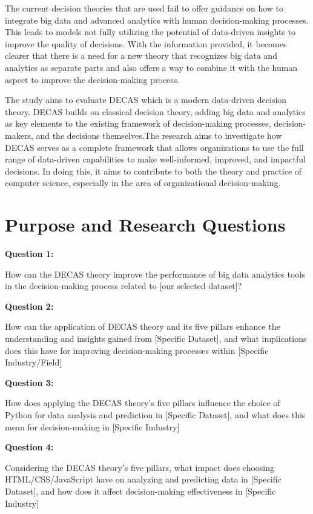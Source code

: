 The current decision theories that are used fail to offer guidance on how to integrate big data and advanced analytics with human decision-making processes. This leads to models not fully utilizing the potential of data-driven insights to improve the quality of decisions. With the information provided, it becomes clearer that there is a need for a new theory that recognizes big data and analytics as separate parts and also offers a way to combine it with the human aspect to improve the decision-making process.

The study aims to evaluate DECAS which is a modern data-driven decision theory. DECAS builds on classical decision theory, adding big data and analytics as key elements to the existing framework of decision-making processes, decision-makers, and the decisions themselves.The research aims to investigate how DECAS serves as a complete framework that allows organizations to use the full range of data-driven capabilities to make well-informed, improved, and impactful decisions. In doing this, it aims to contribute to both the theory and practice of computer science, especially in the area of organizational decision-making.

\section{Purpose and Research Questions}
\textbf{Question 1:}

How can the DECAS theory improve the performance of big data analytics tools in the decision-making process related to [our selected dataset]?

\textbf{Question 2:}


How can the application of DECAS theory and its five pillars enhance the understanding and insights gained from [Specific Dataset], and what implications does this have for improving decision-making processes within [Specific Industry/Field]


\textbf{Question 3:}


How does applying the DECAS theory's five pillars influence the choice of Python for data analysis and prediction in [Specific Dataset], and what does this mean for decision-making in [Specific Industry]


\textbf{Question 4:}


Considering the DECAS theory's five pillars, what impact does choosing HTML/CSS/JavaScript have on analyzing and predicting data in [Specific Dataset], and how does it affect decision-making effectiveness in [Specific Industry]



